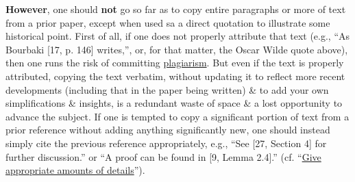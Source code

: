 \documentclass[oneside]{book}
\numberwithin{equation}{section}
\begin{document}
\textbf{However}, one should \textbf{not} go so far as to copy entire paragraphs or more of text from a prior paper, except when used sa a direct quotation to illustrate some historical point. First of all, if one does not properly attribute that text (e.g., ``As Bourbaki [17, p. 146] writes,'', or, for that matter, the Oscar Wilde quote above), then one runs the risk of committing \href{http://en.wikipedia.org/wiki/Plagiarism}{plagiarism}. But even if the text is properly attributed, copying the text verbatim, without updating it to reflect more recent developments (including that in the paper being written) \& to add your own simplifications \& insights, is a redundant waste of space \& a lost opportunity to advance the subject. If one is tempted to copy a significant portion of text from a prior reference without adding anything significantly new, one should instead simply cite the previous reference appropriately, e.g., ``See [27, Section 4] for further discussion.'' or ``A proof can be found in [9, Lemma 2.4].'' (cf. ``\href{https://terrytao.wordpress.com/advice-on-writing-papers/give-appropriate-amounts-of-detail/}{Give appropriate amounts of details}'').
\end{document}

